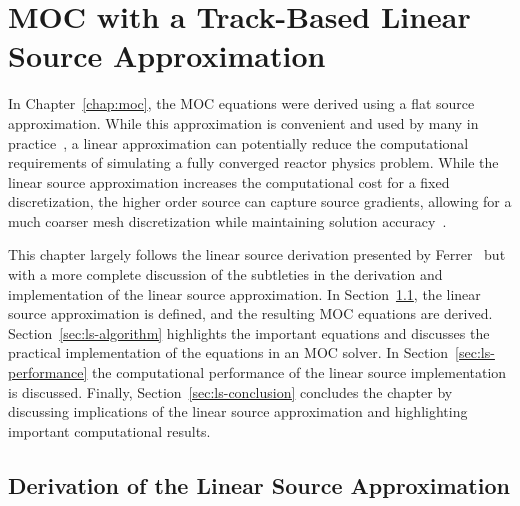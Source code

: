 \chapter{MOC with a Track-Based Linear Source Approximation}
\label{chap:linear-source}

In Chapter~\ref{chap:moc}, the MOC equations were derived using a flat source approximation. While this approximation is convenient and used by many in practice~\cite{dragon_3d_moc, kochunas, apollo3_vv, cactus_3d, liu_mrt, mockingbird}, a linear approximation can potentially reduce the computational requirements of simulating a fully converged reactor physics problem. While the linear source approximation increases the computational cost for a fixed discretization, the higher order source can capture source gradients, allowing for a much coarser mesh discretization while maintaining solution accuracy~\cite{ferrer2012linear}. 

This chapter largely follows the linear source derivation presented by Ferrer~\cite{ferrer2015linear} but with a more complete discussion of the subtleties in the derivation and implementation of the linear source approximation. In Section~\ref{sec:ls-derivation}, the linear source approximation is defined, and the resulting \ac{MOC} equations are derived. Section~\ref{sec:ls-algorithm} highlights the important equations and discusses the practical implementation of the equations in an \ac{MOC} solver. In Section~\ref{sec:ls-performance} the computational performance of the linear source implementation is discussed. Finally, Section~\ref{sec:ls-conclusion} concludes the chapter by discussing implications of the linear source approximation and highlighting important computational results.

\section{Derivation of the Linear Source Approximation}
\label{sec:ls-derivation}

